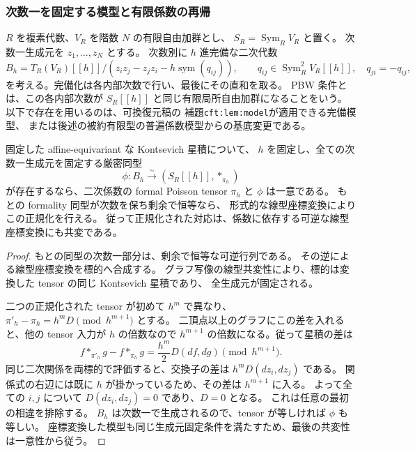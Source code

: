 \subsubsection{次数一を固定する模型と有限係数の再帰}

$R$ を複素代数、$V_R$ を階数 $N$ の有限自由加群とし、
$S_R=\operatorname{Sym}_R V_R$ と置く。
次数一生成元を $z_1,\ldots,z_N$ とする。
次数別に $h$ 進完備な二次代数
\[
 B_h=T_R(V_R)[[h]]\Big/
 \left(z_i z_j-z_j z_i-h\operatorname{sym}(q_{ij})\right),
 \qquad q_{ij}\in\operatorname{Sym}^2_R V_R[[h]],\quad q_{ji}=-q_{ij},
\]
を考える。完備化は各内部次数で行い、最後にその直和を取る。
PBW 条件とは、この各内部次数が $S_R[[h]]$ と同じ有限局所自由加群になることをいう。
以下で存在を用いるのは、可換復元稿の
補題\texttt{cft:lem:model}が適用できる完備模型、
または後述の被約有限型の普遍係数模型からの基底変更である。

\begin{lemma}[生成元を固定する正規化の一意性]
\label{lem:nfm-normalized-star-model}
固定した affine-equivariant な Kontsevich 星積\cite[Section~6.3]{NFMKontsevich}について、
$h$ を固定し、全ての次数一生成元を固定する厳密同型
\[
 \phi:B_h\xrightarrow{\sim}(S_R[[h]],*_{\pi_h})
\]
が存在するなら、二次係数の formal Poisson tensor $\pi_h$ と $\phi$ は一意である。
もとの formality 同型が次数を保ち剰余で恒等なら、
形式的な線型座標変換によりこの正規化を行える。
従って正規化された対応は、係数に依存する可逆な線型座標変換にも共変である。
\end{lemma}

\begin{proof}
もとの同型の次数一部分は、剰余で恒等な可逆行列である。
その逆による線型座標変換を標的へ合成する。
グラフ写像の線型共変性により、標的は変換した tensor の同じ Kontsevich 星積であり、
全生成元が固定される。

二つの正規化された tensor が初めて $h^m$ で異なり、
$\pi'_h-\pi_h=h^mD\pmod{h^{m+1}}$ とする。
二頂点以上のグラフにこの差を入れると、他の tensor 入力が $h$ の倍数なので
$h^{m+1}$ の倍数になる。従って星積の差は
\[
 f*_{\pi'_h}g-f*_{\pi_h}g
 =\frac{h^m}{2}D(df,dg)\pmod{h^{m+1}}.
\]
同じ二次関係を両標的で評価すると、交換子の差は
$h^mD(dz_i,dz_j)$ である。
関係式の右辺には既に $h$ が掛かっているため、その差は $h^{m+1}$ に入る。
よって全ての $i,j$ について $D(dz_i,dz_j)=0$ であり、$D=0$ となる。
これは任意の最初の相違を排除する。
$B_h$ は次数一で生成されるので、tensor が等しければ $\phi$ も等しい。
座標変換した模型も同じ生成元固定条件を満たすため、最後の共変性は一意性から従う。
\end{proof}


